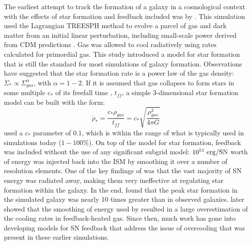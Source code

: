 The earliest attempt to track the formation of a galaxy in a cosmological
context with the effects of star formation and feedback included was by
\citet{Katz1992}.  This simulation used the Lagrangian TREESPH method
\citep{Hernquist1989} to evolve a parcel of gas and dark matter from an initial
linear perturbation, including small-scale power derived from CDM predictions
\citep{Zeldovich1970,Peebles1982}.  Gas was allowed to cool radiatively using
rates calculated for primordial gas.  This study introduced a model for star
formation that is still the standard for most simulations of galaxy formation.
Observations \citep{Kennicutt1998} have suggested that the star formation rate
is a power law of the gas density: $\dot\Sigma_*\propto\Sigma_{gas}^\alpha$, with
$\alpha=1-2$.  If it is assumed that gas collapses to form stars in some
multiple $c_*$ of its freefall time \citep{Schmidt1959}, $t_{ff}$, a simple
3-dimensional star formation model can be built with the form:
\begin{equation}
    \dot\rho_* = \frac{c_*\rho_{gas}}{t_{ff}} = c_*\sqrt{\frac{\rho^3_{gas}}{4\pi G}}
\end{equation}
\citet{Katz1992} used a $c_*$ parameter of $0.1$, which is within the range of
what is typically used in simulations today ($1-100\%$).  On top of the model
for star formation, feedback was included without the use of any significant
subgrid model:  $10^{51}\;\rm{erg/SN}$ worth of energy was injected back into
the ISM by smoothing it over a number of resolution elements.  One of the key
findings of \citet{Katz1992} was that the vast majority of SN energy was
radiated away, making them very ineffective at regulating star formation within
the galaxy.  In the end, \citet{Katz1992} found that the peak star formation in
the simulated galaxy was nearly 10 times greater than in observed galaxies.
\citet{Thacker2000} later showed that the smoothing of energy used by
\citet{Katz1992} resulted in a large overestimation of the cooling rates in
feedback-heated gas. Since then, much work has gone into developing models for
SN feedback that address the issue of overcooling that was present in these
earlier simulations.

